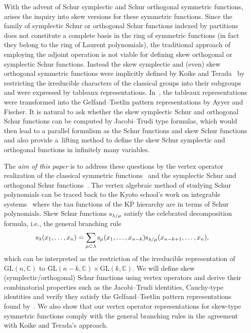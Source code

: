 \documentclass[10pt,a4paper]{amsart}
\numberwithin{equation}{section}
\begin{document}
With the advent of Schur symplectic and Schur orthogonal symmetric functions, arises the inquiry into skew versions for these symmetric functions.
Since the family of symplectic Schur or orthogonal Schur functions indexed by partitions does not constitute a complete basis in the ring of symmetric functions (in fact they belong to the ring of Laurent polynomials), the traditional approach of employing the adjoint operation is not viable for defining skew orthogonal or symplectic Schur functions. Instead the skew symplectic and (even) skew orthogonal symmetric functions were implicitly defined by
Koike and Terada~\cite{KT1990} by restricting the irreducible characters of the classical groups into their subgroups and were
expressed by tableaux representations. In~\cite{AF2020}, the tableaux representations were transformed into the Gelfand--Tsetlin pattern
representations by Ayyer and Fischer. It is natural to ask whether the skew symplectic Schur and orthogonal Schur functions can be computed by
Jacobi--Trudi type formulas, which would then lead to a parallel formulism as the Schur functions and skew Schur functions and also provide
a~lifting method to define the skew Schur symplectic and orthogonal functions in infinitely many variables.

The {\it aim of this paper} is to address these questions by
the vertex operator
realization of the classical symmetric functions~\cite{Jing1991} and the symplectic Schur and orthogonal Schur functions~\cite{Ba1996,JN2015}. The vertex algebraic method of studying Schur polynomials
can be traced back to the Kyoto school's work on integrable systems~\cite{DJKM} where the tau functions of the KP hierarchy are in terms of Schur polynomials.
Skew Schur functions ${\rm s}_{\lambda/\mu}$ satisfy the celebrated decomposition formula, i.e., the general branching rule
\begin{align*}%
&{\rm s}_\lambda(x_1,\dots,x_n)=\sum_{\mu\subset\lambda}{\rm s}_\mu(x_1,\dots,x_{n-k}){\rm s}_{\lambda/\mu}(x_{n-k+1},\dots,x_{n}),
\end{align*}
which can be interpreted as the restriction of the irreducible representation of $\mathrm{GL}(n,\mathbb{C})$ to $\mathrm{GL}(n-k,\mathbb{C})\times \mathrm{GL}(k,\mathbb{C})$.
We will define skew (symplectic/orthogonal) Schur functions using vertex operators and derive their combinatorial properties such as the Jacobi--Trudi identities, Cauchy-type identities and verify they satisfy the Gelfand--Tsetlin pattern representations found by~\cite{AF2020}.
We also show that our vertex operator representations for skew-type symmetric functions comply with the general branching rules in the agreement with
Koike and Terada's approach.
\end{document}

